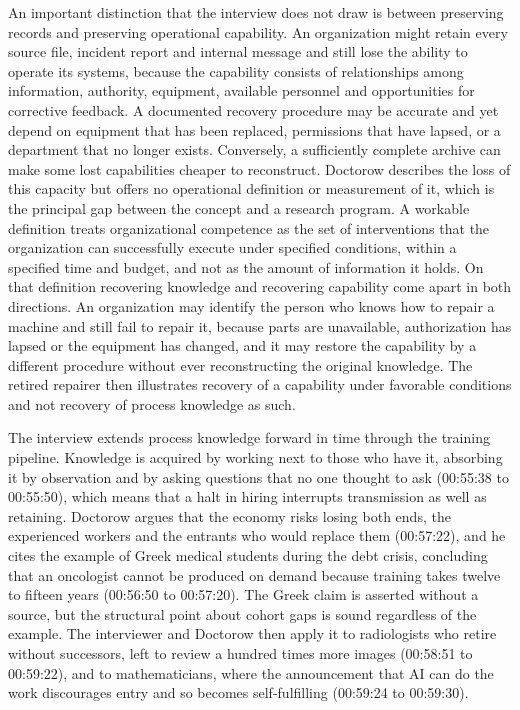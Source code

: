 \documentclass[12pt]{article}
\newcommand{\ts}[1]{(#1)}
\begin{document}
An important distinction that the interview does not draw is between preserving records and preserving operational capability. An organization might retain every source file, incident report and internal message and still lose the ability to operate its systems, because the capability consists of relationships among information, authority, equipment, available personnel and opportunities for corrective feedback. A documented recovery procedure may be accurate and yet depend on equipment that has been replaced, permissions that have lapsed, or a department that no longer exists. Conversely, a sufficiently complete archive can make some lost capabilities cheaper to reconstruct. Doctorow describes the loss of this capacity but offers no operational definition or measurement of it, which is the principal gap between the concept and a research program. A workable definition treats organizational competence as the set of interventions that the organization can successfully execute under specified conditions, within a specified time and budget, and not as the amount of information it holds. On that definition recovering knowledge and recovering capability come apart in both directions. An organization may identify the person who knows how to repair a machine and still fail to repair it, because parts are unavailable, authorization has lapsed or the equipment has changed, and it may restore the capability by a different procedure without ever reconstructing the original knowledge. The retired repairer then illustrates recovery of a capability under favorable conditions and not recovery of process knowledge as such.

The interview extends process knowledge forward in time through the training pipeline. Knowledge is acquired by working next to those who have it, absorbing it by observation and by asking questions that no one thought to ask \ts{00:55:38 to 00:55:50}, which means that a halt in hiring interrupts transmission as well as retaining. Doctorow argues that the economy risks losing both ends, the experienced workers and the entrants who would replace them \ts{00:57:22}, and he cites the example of Greek medical students during the debt crisis, concluding that an oncologist cannot be produced on demand because training takes twelve to fifteen years \ts{00:56:50 to 00:57:20}. The Greek claim is asserted without a source, but the structural point about cohort gaps is sound regardless of the example. The interviewer and Doctorow then apply it to radiologists who retire without successors, left to review a hundred times more images \ts{00:58:51 to 00:59:22}, and to mathematicians, where the announcement that AI can do the work discourages entry and so becomes self-fulfilling \ts{00:59:24 to 00:59:30}.
\end{document}
